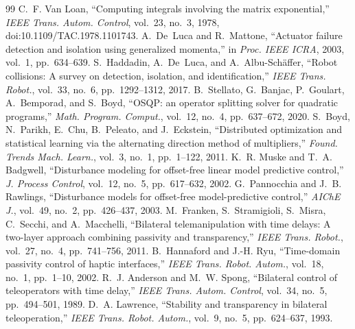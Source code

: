 \documentclass[11pt,a4paper]{article}
\theoremstyle{remark}
\theoremstyle{definition}
\begin{document}
\begin{thebibliography}{99}\small
{} C.~F. Van Loan, ``Computing integrals involving the matrix exponential,'' \emph{IEEE Trans. Autom. Control}, vol.~23, no.~3, 1978, doi:10.1109/TAC.1978.1101743.
 A.~De~Luca and R.~Mattone, ``Actuator failure detection and isolation using generalized momenta,'' in \emph{Proc. IEEE ICRA}, 2003, vol.~1, pp.~634--639.
 S.~Haddadin, A.~De~Luca, and A.~Albu-Sch\"affer, ``Robot collisions: A survey on detection, isolation, and identification,'' \emph{IEEE Trans. Robot.}, vol.~33, no.~6, pp.~1292--1312, 2017.
 B.~Stellato, G.~Banjac, P.~Goulart, A.~Bemporad, and S.~Boyd, ``OSQP: an operator splitting solver for quadratic programs,'' \emph{Math. Program. Comput.}, vol.~12, no.~4, pp.~637--672, 2020.
 S.~Boyd, N.~Parikh, E.~Chu, B.~Peleato, and J.~Eckstein, ``Distributed optimization and statistical learning via the alternating direction method of multipliers,'' \emph{Found. Trends Mach. Learn.}, vol.~3, no.~1, pp.~1--122, 2011.
 K.~R. Muske and T.~A. Badgwell, ``Disturbance modeling for offset-free linear model predictive control,'' \emph{J. Process Control}, vol.~12, no.~5, pp.~617--632, 2002.
 G.~Pannocchia and J.~B. Rawlings, ``Disturbance models for offset-free model-predictive control,'' \emph{AIChE J.}, vol.~49, no.~2, pp.~426--437, 2003.
 M.~Franken, S.~Stramigioli, S.~Misra, C.~Secchi, and A.~Macchelli, ``Bilateral telemanipulation with time delays: A two-layer approach combining passivity and transparency,'' \emph{IEEE Trans. Robot.}, vol.~27, no.~4, pp.~741--756, 2011.
 B.~Hannaford and J.-H. Ryu, ``Time-domain passivity control of haptic interfaces,'' \emph{IEEE Trans. Robot. Autom.}, vol.~18, no.~1, pp.~1--10, 2002.
 R.~J. Anderson and M.~W. Spong, ``Bilateral control of teleoperators with time delay,'' \emph{IEEE Trans. Autom. Control}, vol.~34, no.~5, pp.~494--501, 1989.
 D.~A. Lawrence, ``Stability and transparency in bilateral teleoperation,'' \emph{IEEE Trans. Robot. Autom.}, vol.~9, no.~5, pp.~624--637, 1993.
\end{thebibliography}
\end{document}
